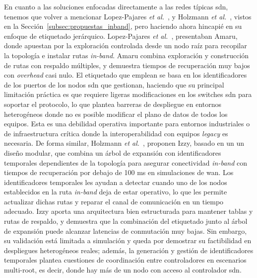 En cuanto a las soluciones enfocadas directamente a las redes típicas \gls{sdn}, tenemos que volver a mencionar Lopez-Pajares \textit{et al.}~\cite{Lopez-Pajares19}, y Holzmann \textit{et al.}~\cite{Holzmann19}, vistos en la Sección~\ref{subsec:propuestas_inband}, pero haciendo ahora hincapié en su enfoque de etiquetado jerárquico. Lopez-Pajares \textit{et al.}~\cite{Lopez-Pajares19}, presentaban Amaru, donde apuestan por la exploración controlada desde un nodo raíz para recopilar la topología e instalar rutas \textit{in-band}. Amaru combina exploración y construcción de rutas con respaldo múltiples, y demuestra tiempos de recuperación muy bajos con \textit{overhead} casi nulo. El etiquetado que emplean se basa en los identificadores de los puertos de los nodos \gls{sdn} que gestionan, haciendo que su principal limitación práctica es que requiere ligeras modificaciones en los switches \gls{sdn} para soportar el protocolo, lo que plantea barreras de despliegue en entornos heterogéneos donde no es posible modificar el plano de datos de todos los equipos. Esta es una debilidad operativa importante para entornos industriales o de infraestructura crítica donde la interoperabilidad con equipos \textit{legacy} es necesaria. De forma similar, Holzmann \textit{et al.}~\cite{Holzmann19}, proponen Izzy, basado en un un diseño modular, que combina un árbol de expansión con identificadores temporales dependientes de la topología para asegurar conectividad \textit{in-band} con tiempos de recuperación por debajo de 100 ms en simulaciones de \gls{wan}. Los identificadores temporales les ayudan a detectar cuando uno de los nodos establecidos en la ruta \textit{in-band} deja de estar operativo, lo que les permite actualizar dichas rutas y reparar el canal de comunicación en un tiempo adecuado. Izzy aporta una arquitectura bien estructurada para mantener tablas y rutas de respaldo, y demuestra que la combinación del etiquetado junto al árbol de expansión puede alcanzar latencias de conmutación muy bajas. Sin embargo, su validación está limitada a simulación y queda por demostrar su factibilidad en despliegues heterogéneos reales; además, la generación y gestión de identificadores temporales plantea cuestiones de coordinación entre controladores en escenarios multi-root, es decir, donde hay más de un nodo con acceso al controlador \gls{sdn}.\\
\\
